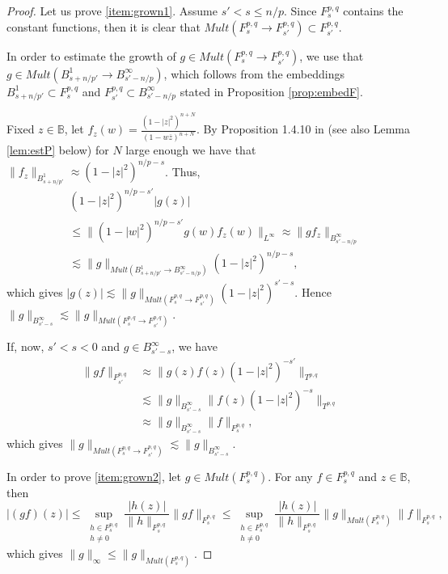 \documentclass[12pt,twoside,leqno,final]{amsart}
\theoremstyle{plain}
\begin{document}
\begin{proof}
Let us prove \eqref{item:grown1}. Assume $s'<s\le n/p$.
Since $F^{p,q}_s$ contains the constant functions, then it is clear that 
$Mult(F^{p,q}_s\to F^{p,q}_{s'})\subset  F^{p,q}_{s'}$.

In order to estimate the growth of $g\in Mult(F^{p,q}_s\to F^{p,q}_{s'})$, 
we use that $g\in Mult(B^1_{s+n/p'}\to B^\infty_{s'-n/p})$, which follows 
from the embeddings $B^1_{s+n/p'}\subset F^{p,q}_s$ and 
$F^{p,q}_{s'}\subset B^\infty_{s'-n/p}$ stated in Proposition \ref{prop:embedF}.

 
Fixed $z\in{{\mathbb B}}$, let $f_z(w)=\frac{(1-|z|^2)^{n+N}}{(1-w\overline z)^{n+N}}$.  By Proposition 1.4.10 in \cite{rudin} (see also Lemma \ref{lem:estP} below)
for  $N$ large enough 
we have that $\|f_z\|_{B^1_{s+n/p'}}\approx (1-|z|^2)^{n/p-s}$.
 Thus,  
\begin{equation}\label{eqn:grown1}\begin{split}
&(1-|z|^2)^{n/p-s'}|g(z)|\\
&\le \|(1-|w|^2)^{n/p-s'}g(w)f_z(w)\|_{L^\infty}
\approx \|g f_z\|_{B^\infty_{s'-n/p}}\\
&\lesssim  \|g\|_{Mult(B^1_{s+n/p'}\to B^\infty_{s'-n/p})}(1-|z|^2)^{n/p-s},
\end{split}\end{equation}
which gives $|g(z)|\lesssim \|g\|_{Mult(F_s^{p,q}\to F_{s'}^{p,q})}(1-|z|^2)^{s'-s}$. 
Hence $\|g\|_{B^\infty_{s'-s}}\lesssim \|g\|_{Mult(F_s^{p,q}\to F_{s'}^{p,q})}$.

If, now,  $s'<s<0$ and $g\in B^\infty_{s'-s}$, we have  
\begin{equation}\label{eqn:grown2}\begin{split}
\|gf\|_{F^{p,q}_{s'}}&\approx\|g(z)f(z)(1-|z|^2)^{-s'}\|_{T^{p,q}}\\
&\lesssim \|g\|_{B^\infty_{s'-s}}\|f(z)(1-|z|^2)^{-s}\|_{T^{p,q}}\\
&\approx \|g\|_{B^\infty_{s'-s}}\|f\|_{F^{p,q}_{s}},
\end{split}\end{equation}
which gives $\|g\|_{Mult(F_s^{p,q}\to F_{s'}^{p,q})}\lesssim \|g\|_{B^\infty_{s'-s}}$.

In order to prove \eqref{item:grown2},  let $g\in Mult(F^{p,q}_s)$. For any $f\in F^{p,q}_s$ and $z\in{{\mathbb B}}$, then
$$
|(gf)(z)|\le \sup_{\substack{h\in F^{p,q}_s\\h\ne 0}}\frac{|h(z)|}{\|h\|_{F^{p,q}_s}}\|gf\|_{F^{p,q}_s}
\le \sup_{\substack{h\in F^{p,q}_s\\h\ne 0}}\frac{|h(z)|}{\|h\|_{F^{p,q}_s}} \|g\|_{Mult(F^{p,q}_s)}\|f\|_{F^{p,q}_s},
$$
which gives $\|g\|_\infty\le \|g\|_{Mult(F^{p,q}_s)}$.


\end{proof}
\end{document}
